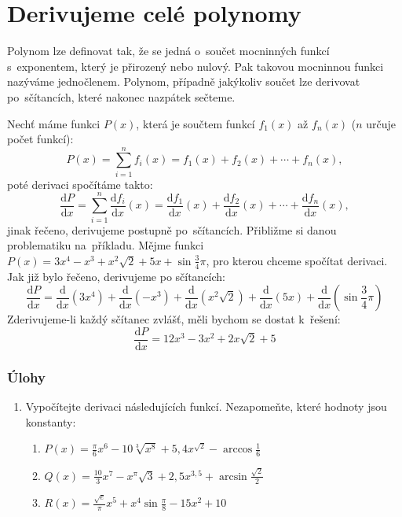 \vfill{}
\pagebreak
\section{Derivujeme celé polynomy}

Polynom lze definovat tak, že se jedná o~součet mocninných funkcí s~exponentem, který je přirozený nebo nulový. Pak takovou mocninnou funkci nazýváme jednočlenem. Polynom, případně jakýkoliv součet lze derivovat po~sčítancích, které nakonec nazpátek sečteme.

Nechť máme funkci $P(x)$, která je součtem funkcí $f_1(x)$ až $f_n(x)$ ($n$ určuje počet funkcí):
\begin{equation*}
    P(x) = \sum_{i = 1}^n f_i(x) = f_1(x) + f_2(x) + \cdots + f_n(x),
\end{equation*}
poté derivaci spočítáme takto:
\begin{equation*}
    \frac{\text{d}P}{\text{d}x} = \sum_{i = 1}^n \frac{\text{d}f_i}{\text{d}x}(x)
    = \frac{\text{d}f_1}{\text{d}x}(x)
    + \frac{\text{d}f_2}{\text{d}x}(x)
    + \cdots + \frac{\text{d}f_n}{\text{d}x}(x),
\end{equation*}
jinak řečeno, derivujeme postupně po~sčítancích. Přibližme si danou problematiku na~příkladu. Mějme funkci $P(x) = 3x^4 - x^3 + x^2 \sqrt2 + 5x + \sin \frac34 \pi$, pro kterou chceme spočítat derivaci. Jak již bylo řečeno, derivujeme po sčítancích:
\begin{equation*}
    \frac{\text{d}P}{\text{d}x}
    = \frac{\text{d}}{\text{d}x} \left( 3x^4 \right)
    + \frac{\text{d}}{\text{d}x} \left( -x^3 \right)
    + \frac{\text{d}}{\text{d}x} \left( x^2 \sqrt2 \right)
    + \frac{\text{d}}{\text{d}x} \left( 5x \right)
    + \frac{\text{d}}{\text{d}x} \left( \sin \frac34 \pi \right)
\end{equation*}
Zderivujeme-li každý sčítanec zvlášť, měli bychom se dostat k~řešení:
\begin{equation*}
    \frac{\text{d}P}{\text{d}x} = 12x^3 - 3x^2 + 2x \sqrt2 + 5
\end{equation*}

\subsubsection*{Úlohy}
\begin{enumerate}
    \item Vypočítejte derivaci následujících funkcí. Nezapomeňte, které hodnoty jsou konstanty:
    \begin{enumerate}
        \item $\displaystyle P(x)
        = \frac{\pi}{6} x^6 - 10\sqrt[3]{x^8} + 5,4x^{\sqrt2} - \arccos \frac{1}{6}$
        \item $\displaystyle Q(x)
        = \frac{10}{3} x^7 - x^\pi \sqrt3 + 2,5x^{3,5} + \arcsin \frac{\sqrt2}{2}$
        \item $\displaystyle R(x)
        = \frac{\sqrt{e}}{\pi} x^5 + x^4 \sin \frac{\pi}{8} - 15x^2 + 10$
    \end{enumerate}
\end{enumerate}
